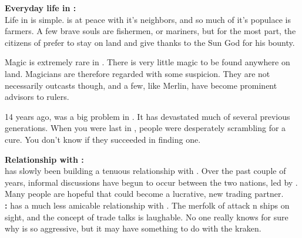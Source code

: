 \documentclass[blue]{NeptuneBall}
\begin{document}
{\bf Everyday life in \pAmerica{}:}\\
Life in \pAmerica{} is simple. \pAmerica{} is at peace with it's neighbors, and so much of it's populace is farmers. A few brave souls are fishermen, or mariners,  but for the most part, the citizens of \pAmerica{} prefer to stay on land and give thanks to the Sun God for his bounty.

Magic is extremely rare in \pAmerica{}. There is very little magic to be found anywhere on land. Magicians are therefore regarded with some suspicion. They are not necessarily outcasts though, and a few, like Merlin, have become prominent advisors to rulers.

14 years ago, \cPolio{} was  a big problem in \pAmerica{}. It has devastated much of several previous generations. When you were last in \pAmerica{}, people were desperately scrambling for a cure. You don't know if they succeeded in finding one.

{\bf Relationship with \pAtlantis{}:}\\
\pAmerica{} has slowly been building a tenuous relationship with \pAtlantis{}. Over the past couple of years, informal discussions  have begun to occur between the two nations, led by \cAriel{\King} \cAriel{}. Many people are hopeful that \pAtlantis{} could become a lucrative, new trading partner.\\
{\bf \pPacifica{}:} \pAmerica{} has a much less amicable relationship with \pPacifica{}. The merfolk of \pPacifica{} attack \pAmerica{}n ships on sight, and the concept of trade talks is laughable. No one really knows for sure why \pPacifica{} is so aggressive, but it may have something to do with the kraken.
\end{document}
